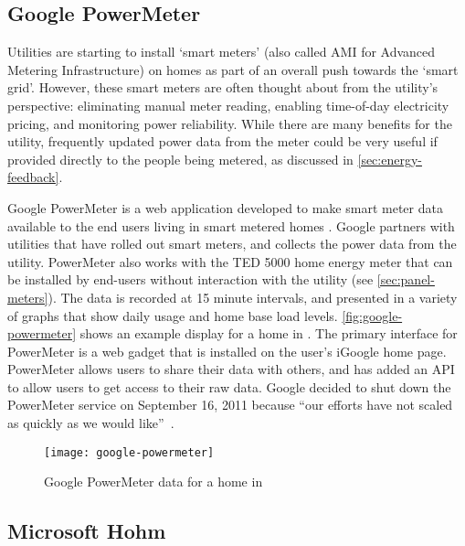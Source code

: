 \subsection{Google PowerMeter}
\label{sec:google-powermeter}

Utilities are starting to install `smart meters' (also called AMI for Advanced Metering Infrastructure) on homes as part of an overall push towards the `smart grid'. However, these smart meters are often thought about from the utility's perspective: eliminating manual meter reading, enabling time-of-day electricity pricing, and monitoring power reliability. While there are many benefits for the utility, frequently updated power data from the meter could be very useful if provided directly to the people being metered, as discussed in \autoref{sec:energy-feedback}.

Google PowerMeter is a web application developed to make smart meter data available to the end users living in smart metered homes \cite{Google-PowerMeter}. Google partners with utilities that have rolled out smart meters, and collects the power data from the utility. PowerMeter also works with the TED 5000 home energy meter that can be installed by end-users without interaction with the utility (see \autoref{sec:panel-meters}). The data is recorded at 15 minute intervals, and presented in a variety of graphs that show daily usage and home base load levels. \autoref{fig:google-powermeter} shows an example display for a home in \Hawaii. The primary interface for PowerMeter is a web gadget that is installed on the user's iGoogle home page. PowerMeter allows users to share their data with others, and has added an API to allow users to get access to their raw data. Google decided to shut down the PowerMeter service on September 16, 2011 because ``our efforts have not scaled as quickly as we would like''~\cite{PowerMeter-shutdown}.

\begin{figure}[htbp]
	\centering
		\texttt{[image: google-powermeter]}
		\caption{Google PowerMeter data for a home in \Hawaii}
		\label{fig:google-powermeter}
\end{figure}

\subsection{Microsoft Hohm}

